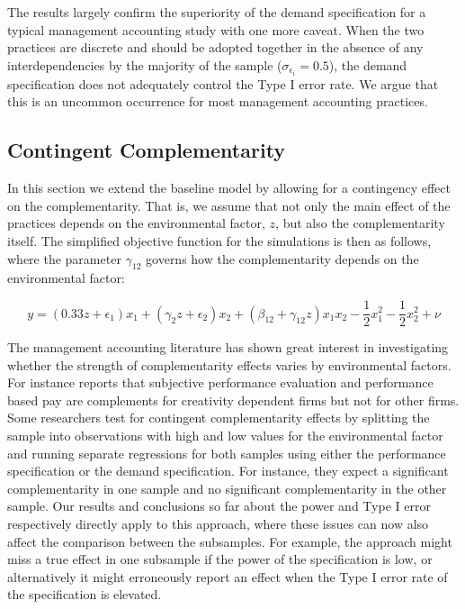 \documentclass[12pt]{article}
\begin{document}
The results largely confirm the superiority of the demand specification for a typical management accounting study with one more caveat. When the two practices are discrete and should be adopted together in the absence of any interdependencies by the majority of the sample ($\sigma_{\epsilon_i} = 0.5$), the demand specification does not adequately control the Type I error rate. We argue that this is an uncommon occurrence for most management accounting practices.



\subsection{Contingent Complementarity}\label{contingent-complementarity}

In this section we extend the baseline model by allowing for a contingency effect on the complementarity. That is, we assume that not only the main effect of the practices depends on the environmental factor, $z$, but also the complementarity itself. The simplified objective function for the simulations is then as follows, where the parameter $\gamma_{12}$ governs how the complementarity depends on the environmental factor: 

\begin{equation}
\label{eq:contingent-complement}
y = (0.33 z + \epsilon_1) x_1 + (\gamma_2 z + \epsilon_2) x_2 + 
    (\beta_{12} + \gamma_{12} z) x_1 x_2 - \frac{1}{2} x^2_1 - \frac{1}{2} x^2_2 + \nu
\end{equation}

The management accounting literature has shown great interest in investigating whether the strength of complementarity effects varies by environmental factors. For instance \citet{grabner_incentive_2014} reports that subjective performance evaluation and performance based pay are complements for creativity dependent firms but not for other firms. Some researchers test for contingent complementarity effects by splitting the sample into observations with high and low values for the environmental factor and running separate regressions for both samples using either the performance specification or the demand specification. For instance, they expect a significant complementarity in one sample and no significant complementarity in the other sample. Our results and conclusions so far about the power and Type I error respectively directly apply to this approach, where these issues can now also affect the comparison between the subsamples. For example, the approach might miss a true effect in one subsample if the power of the specification is low, or alternatively it might erroneously report an effect when the Type I error rate of the specification is elevated. 
\end{document}
